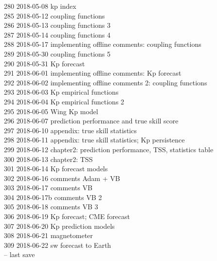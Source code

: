 \begin{footnotesize}
280	2018-05-08	kp index\\
285	2018-05-12	coupling functions\\
286	2018-05-13	coupling functions 3\\
287	2018-05-14	coupling functions 4\\
288	2018-05-17	implementing offline comments: coupling functions\\
289	2018-05-30	coupling functions 5\\
290	2018-05-31	Kp forecast\\
291	2018-06-01	implementing offline comments: Kp forecast\\
292	2018-06-02	implementing offline comments 2: coupling functions\\
293	2018-06-03	Kp empirical functions\\
294	2018-06-04	Kp empirical functions 2\\
295	2018-06-05	Wing Kp model\\
296	2018-06-07	prediction performance and true skill score\\
297	2018-06-10	appendix: true skill statistics\\
298	2018-06-11	appendix: true skill statistics; Kp persistence\\
299	2018-06-12	chapter2: prediction performance, TSS, statistics table\\
300	2018-06-13	chapter2: TSS\\
301	2018-06-14	Kp forecast models\\
302	2018-06-16	comments Adam + VB\\
303	2018-06-17	comments VB\\
304	2018-06-17b	comments VB 2\\
305	2018-06-18	comments VB 3\\
306	2018-06-19	Kp forecast; CME forecast\\
307	2018-06-20	Kp prediction models\\
308	2018-06-21	magnetometer\\
309	2018-06-22	sw forecast to Earth\\
\vspace{\baselineskip}
\ISOToday{} \thistime{} -- last save
\end{footnotesize}


